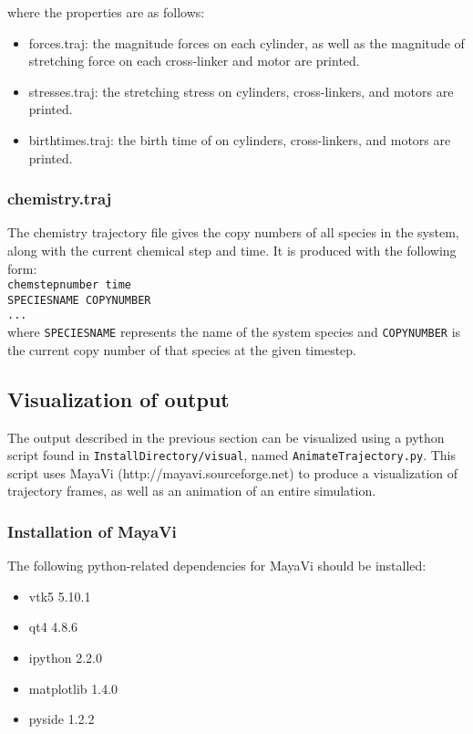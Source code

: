 \documentclass[11pt, oneside]{article}   	%
\begin{document}
\noindent where the properties are as follows:
\begin{itemize}
\item forces.traj: the magnitude forces on each cylinder, as well as the magnitude of stretching force on each cross-linker and motor are printed.
\item stresses.traj: the stretching stress on cylinders, cross-linkers, and motors are printed.
\item birthtimes.traj: the birth time of on cylinders, cross-linkers, and motors are printed.

\end{itemize}

\subsubsection{chemistry.traj}
The chemistry trajectory file gives the copy numbers of all species in the system, along with the current chemical step and time. It is produced with the following form:\\

\noindent\texttt{chemstepnumber time}\\
\texttt{SPECIESNAME COPYNUMBER}\\
\texttt{...}\\

\noindent where \texttt{SPECIESNAME} represents the name of the system species and \texttt{COPYNUMBER} is the current copy number of that species at the given timestep.


\subsection{Visualization of output}

The output described in the previous section can be visualized using a python script found in \texttt{InstallDirectory/visual}, named \texttt{AnimateTrajectory.py}. This script uses MayaVi (http://mayavi.sourceforge.net) to produce a visualization of trajectory frames, as well as an animation of an entire simulation.

\subsubsection{Installation of MayaVi}

The following python-related dependencies for MayaVi should be installed:
\begin{itemize}
\item vtk5 5.10.1
\item qt4 4.8.6
\item ipython 2.2.0
\item matplotlib 1.4.0
\item pyside 1.2.2
\end{itemize}
\end{document}
